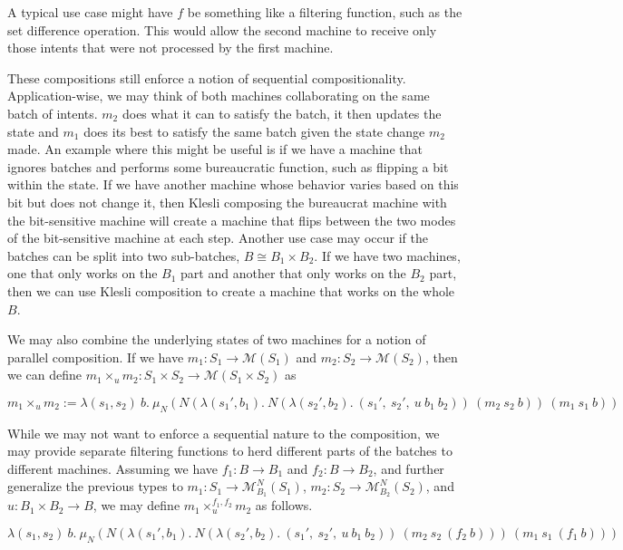 A typical use case might have $f$ be something like a filtering function, such as the set difference operation. This would allow the second machine to receive only those intents that were not processed by the first machine.

These compositions still enforce a notion of sequential compositionality. Application-wise, we may think of both machines collaborating on the same batch of intents. $m_2$ does what it can to satisfy the batch, it then updates the state and $m_1$ does its best to satisfy the same batch given the state change $m_2$ made. An example where this might be useful is if we have a machine that ignores batches and performs some bureaucratic function, such as flipping a bit within the state. If we have another machine whose behavior varies based on this bit but does not change it, then Klesli composing the bureaucrat machine with the bit-sensitive machine will create a machine that flips between the two modes of the bit-sensitive machine at each step. Another use case may occur if the batches can be split into two sub-batches, $B \cong B_1 \times B_2$. If we have two machines, one that only works on the $B_1$ part and another that only works on the $B_2$ part, then we can use Klesli composition to create a machine that works on the whole $B$.

We may also combine the underlying states of two machines for a notion of parallel composition. If we have $m_1 : S_1 \to \mathcal{M}(S_1)$ and $m_2 : S_2 \to \mathcal{M}(S_2)$, then we can define $m_1 \times_{u} m_2 : S_1 \times S_2 \to \mathcal{M}(S_1 \times S_2)$ as

\begin{equation}
    m_1 \times_{u} m_2 := \lambda (s_1, s_2)\ b.\ \mu_N(\textit{}N(\lambda (s_1', b_1).\ N(\lambda (s_2', b_2).\ (s_1',\ s_2',\ u\ b_1\ b_2))\ (m_2\ s_2\ b))\ (m_1\ s_1\ b))
\end{equation}

While we may not want to enforce a sequential nature to the composition, we may provide separate filtering functions to herd different parts of the batches to different machines. Assuming we have $f_1 : B \rightarrow B_1$ and $f_2 : B \rightarrow B_2$, and further generalize the previous types to $m_1 : S_1 \to \mathcal{M}^N_{B_1}(S_1)$, $m_2 : S_2 \to \mathcal{M}^N_{B_2}(S_2)$, and $u : B_1 \times B_2 \rightarrow B$, we may define $m_1 \times^{f_1, f_2}_{u} m_2$ as follows.

\begin{equation}
\lambda (s_1, s_2)\ b.\ \mu_N(N(\lambda (s_1', b_1).\ N(\lambda (s_2', b_2).\ (s_1',\ s_2',\ u\ b_1\ b_2))\ (m_2\ s_2\ (f_2\ b)))\ (m_1\ s_1\ (f_1\ b)))
\end{equation}

